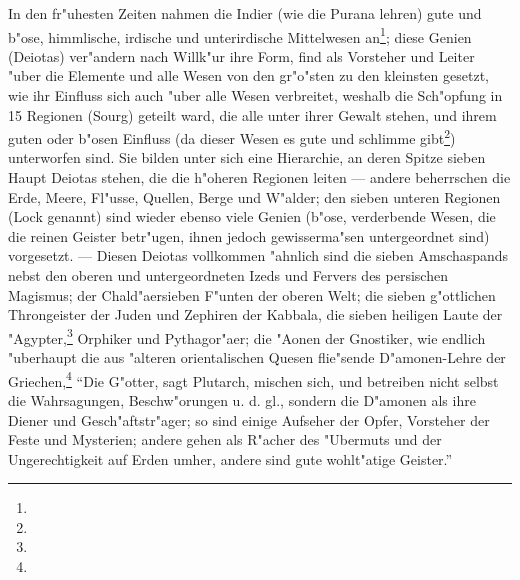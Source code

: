 \documentclass[a4paper, 11pt, oneside, polutonikogreek, german]{article}
\begin{document}
In den fr"uhesten Zeiten nahmen die Indier (wie die Purana lehren) gute und b"ose, himmlische, irdische und unterirdische Mittelwesen an\footnote{}; diese Genien (Deiotas) ver"andern nach Willk"ur ihre Form, find als Vorsteher und Leiter "uber die Elemente und alle Wesen von den gr"o"sten zu den kleinsten gesetzt, wie ihr Einfluss sich auch "uber alle Wesen verbreitet, weshalb die Sch"opfung in 15 Regionen (Sourg) geteilt ward, die alle unter ihrer Gewalt stehen, und ihrem guten oder b"osen Einfluss (da dieser Wesen es gute und schlimme gibt\footnote{}) unterworfen sind. Sie bilden unter sich eine Hierarchie, an deren Spitze sieben Haupt Deiotas stehen, die die h"oheren Regionen leiten --- andere beherrschen die Erde, Meere, Fl"usse, Quellen, Berge und W"alder; den sieben unteren Regionen (Lock genannt) sind wieder ebenso viele Genien (b"ose, verderbende Wesen, die die reinen Geister betr"ugen, ihnen jedoch gewisserma"sen untergeordnet sind) vorgesetzt. --- Diesen Deiotas vollkommen "ahnlich sind die sieben Amschaspands nebst den oberen und untergeordneten Izeds und Fervers des persischen Magismus; der Chald"aersieben F"unten der oberen Welt; die sieben g"ottlichen Throngeister der Juden und Zephiren der Kabbala, die sieben heiligen Laute der "Agypter,\footnote{} Orphiker und Pythagor"aer; die "Aonen der Gnostiker, wie endlich "uberhaupt die aus "alteren orientalischen Quesen flie"sende D"amonen-Lehre der Griechen,\footnote{} "`Die G"otter, sagt Plutarch, mischen sich, und betreiben nicht selbst die Wahrsagungen, Beschw"orungen u. d. gl., sondern die D"amonen als ihre Diener und Gesch"aftstr"ager; so sind einige Aufseher der Opfer, Vorsteher der Feste und Mysterien; andere gehen als R"acher des "Ubermuts und der Ungerechtigkeit auf Erden umher, andere sind gute wohlt"atige Geister."'
\end{document}
